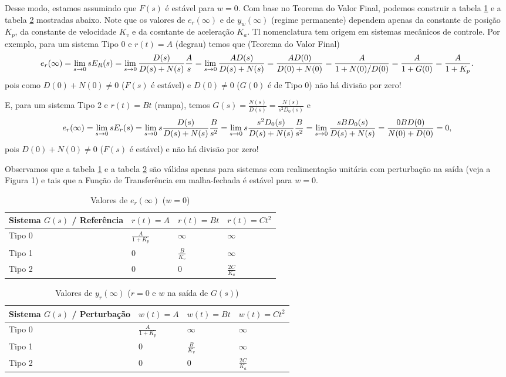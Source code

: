 \documentclass[
]{book}
\begin{document}
Desse modo, estamos assumindo que \(F(s)\) é estável para \(w=0\). Com base no Teorema do Valor Final, podemos construir a tabela \ref{tab:tab1} e a tabela \ref{tab:tab2} mostradas abaixo. Note que os valores de \(e_r(\infty)\) e de \(y_w(\infty)\) (regime permanente) dependem apenas da constante de posição \(K_p\), da constante de velocidade \(K_v\) e da cosntante de aceleração \(K_a\). Tl nomenclatura tem origem em sistemas mecânicos de controle. Por exemplo, para um sistema Tipo 0 e \(r(t)=A\) (degrau) temos que (Teorema do Valor Final)
\[
e_r(\infty) = \lim\limits_{s \to 0}{sE_R(s)}=\lim\limits_{s\to0}{\frac{D(s)}{D(s)+N(s)}\frac{A}{s}} = \lim\limits_{s\to0}{\frac{AD(s)}{D(s)+N(s)}} \\
= \frac{AD(0)}{D(0) + N(0)} = \frac{A}{1+N(0)/D(0)} = \frac{A}{1+G(0)} = \frac {A}{1+K_p}.
\]
pois como \(D(0) + N(0) \neq 0\) (\(F(s)\) é estável) e \(D(0) \neq 0\) (\(G(0)\) é de Tipo 0) não há divisão por zero!

E, para um sistema Tipo 2 e \(r(t) = Bt\) (rampa), temos \(G(s) = \frac{N(s)}{D(s)} = \frac{N(s)}{s^2D_0(s)}\) e
\[
e_r(\infty) = \lim\limits_{s \to 0}{sE_r(s) = \lim\limits_{s \to 0}{s\frac{D(s)}{D(s)+N(s)}\frac{B}{s^2}}} = \lim\limits_{s \to 0}{s\frac{s^2D_0(s)}{D(s)+N(s)}\frac{B}{s^2}}\\
=\lim\limits_{s \to 0}{\frac{sBD_0(s)}{D(s)+N(s)}}=\frac{0BD(0)}{N(0)+D(0)}=0,
\]
pois \(D(0) + N(0) \neq 0\) (\(F(s)\) é estável) e não há divisão por zero!

Observamos que a tabela \ref{tab:tab1} e a tabela \ref{tab:tab2} são válidas apenas para sistemas com realimentação unitária com perturbação na saída (veja a Figura 1) e tais que a Função de Transferência em malha-fechada é estável para \(w=0\).

\begin{table}

\caption{\label{tab:tab1}Valores de $e_r(\infty)$ ($w=0$)}
\centering
\begin{tabular}[t]{llll}
\toprule
Sistema $G(s)$ / Referência & $r(t)=A$ & $r(t) = Bt$ & $r(t) = Ct^2$\\
\midrule
Tipo 0 & $\frac{A}{1 + K_p}$ & $\infty$ & $\infty$\\
Tipo 1 & 0 & $\frac{B}{K_v}$ & $\infty$\\
Tipo 2 & 0 & 0 & $\frac{2C}{K_a}$\\
\bottomrule
\end{tabular}
\end{table}

\begin{table}

\caption{\label{tab:tab2}Valores de $y_r(\infty)$ ($r=0$ e $w$ na saída de $G(s)$)}
\centering
\begin{tabular}[t]{llll}
\toprule
Sistema $G(s)$ / Perturbação & $w(t)=A$ & $w(t) = Bt$ & $w(t) = Ct^2$\\
\midrule
Tipo 0 & $\frac{A}{1 + K_p}$ & $\infty$ & $\infty$\\
Tipo 1 & 0 & $\frac{B}{K_v}$ & $\infty$\\
Tipo 2 & 0 & 0 & $\frac{2C}{K_a}$\\
\bottomrule
\end{tabular}
\end{table}
\end{document}

